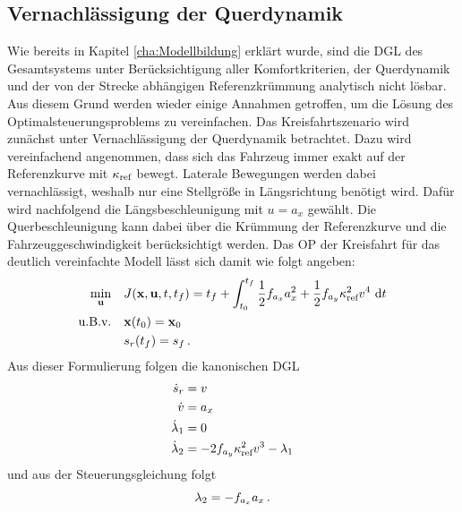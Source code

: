 \subsection{Vernachlässigung der Querdynamik}\label{subsec:Kreisfahrt_ohne_Querdynamik}
Wie bereits in Kapitel \ref{cha:Modellbildung} erklärt wurde, sind die \gls{DGL} des Gesamtsystems unter Berücksichtigung aller Komfortkriterien, der Querdynamik und der von der Strecke abhängigen Referenzkrümmung analytisch nicht lösbar. Aus diesem Grund werden wieder einige Annahmen getroffen, um die Lösung des Optimalsteuerungsproblems zu vereinfachen. Das Kreisfahrtszenario wird zunächst unter Vernachlässigung der Querdynamik betrachtet. Dazu wird vereinfachend angenommen, dass sich das Fahrzeug immer exakt auf der Referenzkurve mit $\kappa_{\textrm{ref}}$ bewegt. Laterale Bewegungen werden dabei vernachlässigt, weshalb nur eine Stellgröße in Längsrichtung benötigt wird. Dafür wird nachfolgend die Längsbeschleunigung mit $u = a_x$ gewählt. Die Querbeschleunigung kann dabei über die Krümmung der Referenzkurve und die Fahrzeuggeschwindigkeit berücksichtigt werden. Das \gls{OP} der Kreisfahrt für das deutlich vereinfachte Modell lässt sich damit wie folgt angeben: 
\begin{align}
\min_{\boldsymbol{\mathrm{u}}} \quad & J(\boldsymbol{\mathrm{x}},\boldsymbol{\mathrm{u}},t,t_f) = t_f + \int_{t_0}^{t_f}\frac{1}{2}f_{a_x} a_x^2 + \frac{1}{2}f_{a_y} \kappa_{\textrm{ref}}^2v^4~\textrm{d}{t} \\
\textrm{u.B.v.} \quad& \boldsymbol{\mathrm{x}}(t_0) = \boldsymbol{\mathrm{x}}_0 \\
& s_r(t_f ) = s_f\,.
\end{align}
Aus dieser Formulierung folgen die kanonischen \gls{DGL} 
\begin{align}
\dot{s}_r &= v \\
\dot{v} &= a_x \label{eq:dot_v_ax}\\
\dot{\lambda}_1 &= 0 \\
\dot{\lambda}_2 &= -2f_{a_y} \kappa_{\textrm{ref}}^2v^3 - \lambda_1 \label{eq:dot_l2_Kreisfahrt}
\end{align}
und aus der Steuerungsgleichung folgt
\begin{equation}
	\lambda_2 = -f_{a_x} a_x\,. \label{eq:l2_Kreisfahrt}
\end{equation}
